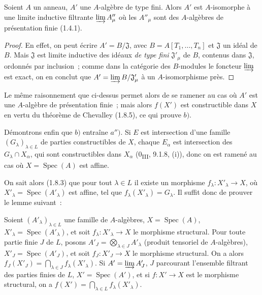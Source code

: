 \begin{lemma}[1.9.3.1]
\label{IV.1.9.3.1-fr}
Soient $A$ un anneau, $A'$ une $A$-algèbre de type fini. Alors $A'$ est
$A$-isomorphe à une limite inductive filtrante $\varinjlim A''_\mu$ où les
$A''_\mu$ sont des $A$-algèbres de présentation finie (1.4.1).
\end{lemma}

\begin{proof}
En effet, on peut écrire $A'=B/\mathfrak J$, avec
$B=A[T_1,\ldots,T_n]$ et $\mathfrak J$ un idéal de $B$. Mais $\mathfrak J$
est limite inductive des idéaux \emph{de type fini} $\mathfrak J'_\mu$ de
$B$, contenus dans $\mathfrak J$, ordonnés par inclusion~; comme dans la
catégorie des $B$-modules le foncteur $\varinjlim$ est exact, on en conclut
que $A'=\varinjlim B/\mathfrak J'_\mu$ à un $A$-isomorphisme près.
\end{proof}

Le même raisonnement que ci-dessus permet alors de se ramener au cas où $A'$
est une $A$-algèbre de présentation finie~; mais alors $f(X')$ est
constructible dans $X$ en vertu du théorème de Chevalley (1.8.5), ce qui
prouve $b)$.

Démontrons enfin que $b)$ entraîne $a'')$. Si $E$ est intersection d'une
famille $(G_\lambda)_{\lambda\in L}$ de parties constructibles de $X$,
chaque $E_\alpha$ est intersection des $G_\lambda\cap X_\alpha$, qui sont
constructibles dans $X_\alpha$ (0\textsubscript{III}, 9.1.8, (i)), donc on
est ramené au cas où $X=\operatorname{Spec}(A)$ est affine.

On sait alors (1.8.3) que pour tout $\lambda\in L$ il existe un morphisme
$f_\lambda:X'_\lambda\to X$, où
$X'_\lambda=\operatorname{Spec}(A'_\lambda)$ est affine, tel que
$f_\lambda(X'_\lambda)=G_\lambda$. Il suffit donc de prouver le lemme
suivant~:

\begin{lemma}[1.9.3.2]
\label{IV.1.9.3.2-fr}
Soient $(A'_\lambda)_{\lambda\in L}$ une famille de $A$-algèbres,
$X=\operatorname{Spec}(A)$, $X'_\lambda=\operatorname{Spec}(A'_\lambda)$,
et soit $f_\lambda:X'_\lambda\to X$ le morphisme structural. Pour toute
partie finie $J$ de $L$, posons
$A'_J=\bigotimes_{\lambda\in J}A'_\lambda$ (produit tensoriel de
$A$-algèbres), $X'_J=\operatorname{Spec}(A'_J)$, et soit $f_J:X'_J\to X$ le
morphisme structural. On a alors
$f_J(X'_J)=\bigcap_{\lambda\in J}f_\lambda(X'_\lambda)$. Si
$A'=\varinjlim A'_J$, $J$ parcourant l'ensemble filtrant des parties finies
de $L$, $X'=\operatorname{Spec}(A')$, et si $f:X'\to X$ est le morphisme
structural, on a $f(X')=\bigcap_{\lambda\in L}f_\lambda(X'_\lambda)$.
\end{lemma}

